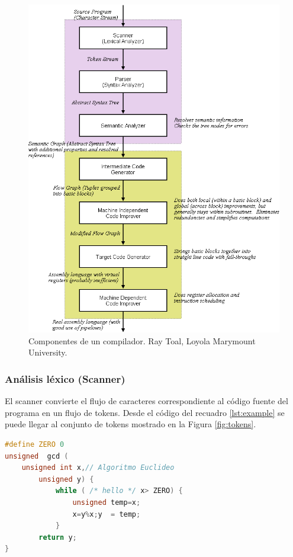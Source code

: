 \begin{figure}[h]
    \centering
    \includegraphics[scale=0.3]{images/compilerphases.png}
    \caption{Componentes de un compilador. Ray Toal, Loyola Marymount University.}
    \label{fig:compiler phases}
\end{figure}


\subsubsection{Análisis léxico (Scanner)}
El scanner convierte el flujo de caracteres correspondiente al código fuente del programa en un flujo de tokens.
Desde el código del recuadro \ref{lst:example} se puede llegar al conjunto de tokens mostrado en la Figura \ref{fig:tokens}.


\begin{lstlisting}[language=c, label={lst:example}, caption={Código de ejemplo}, captionpos={b}, frame={shadowbox}]
#define ZERO 0
unsigned  gcd (
    unsigned int x,// Algoritmo Euclideo
        unsigned y) {
            while ( /* hello */ x> ZERO) {
                unsigned temp=x;
                x=y%x;y  = temp;
            }
        return y;
}
\end{lstlisting}

